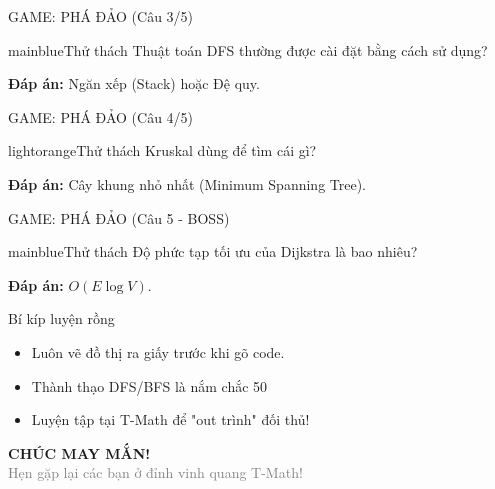 \documentclass[10pt, xcolor={dvipsnames}]{beamer}
\begin{document}
\begin{frame}{GAME: PHÁ ĐẢO (Câu 3/5)}
    \begin{beautybox}{mainblue}{Thử thách}
        Thuật toán DFS thường được cài đặt bằng cách sử dụng?
    \end{beautybox}
    \pause
    \begin{tcolorbox}[colback=green!10, colframe=green!50!black]
        \textbf{Đáp án:} Ngăn xếp (Stack) hoặc Đệ quy.
    \end{tcolorbox}
\end{frame}

\begin{frame}{GAME: PHÁ ĐẢO (Câu 4/5)}
    \begin{beautybox}{lightorange}{Thử thách}
        Kruskal dùng để tìm cái gì?
    \end{beautybox}
    \pause
    \begin{tcolorbox}[colback=green!10, colframe=green!50!black]
        \textbf{Đáp án:} Cây khung nhỏ nhất (Minimum Spanning Tree).
    \end{tcolorbox}
\end{frame}

\begin{frame}{GAME: PHÁ ĐẢO (Câu 5 - BOSS)}
    \begin{beautybox}{mainblue}{Thử thách}
        Độ phức tạp tối ưu của Dijkstra là bao nhiêu?
    \end{beautybox}
    \pause
    \begin{tcolorbox}[colback=yellow!10, colframe=yellow!50!black]
        \textbf{Đáp án:} $O(E \log V)$.
    \end{tcolorbox}
\end{frame}

\begin{frame}{Bí kíp luyện rồng}
    \begin{itemize}
        \item Luôn vẽ đồ thị ra giấy trước khi gõ code.
        \item Thành thạo DFS/BFS là nắm chắc 50%
        \item Luyện tập tại T-Math để "out trình" đối thủ!
    \end{itemize}
\end{frame}

\begin{frame}[plain]
    \centering
    \Huge \textcolor{mainblue}{\textbf{CHÚC MAY MẮN!}}\\
    \vspace{0.5cm}
    \large \textcolor{gray}{Hẹn gặp lại các bạn ở đỉnh vinh quang T-Math!}
\end{frame}
\end{document}
